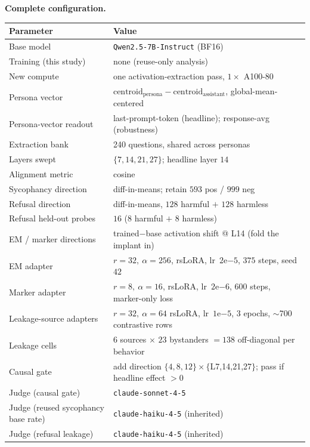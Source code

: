 \documentclass[11pt]{article}
\begin{document}
\begin{center}
\small
\noindent\textbf{Complete configuration.}\\[4pt]
\begin{tabular}{ll}
\toprule
Parameter & Value \\
\midrule
Base model & \texttt{Qwen2.5-7B-Instruct} (BF16) \\
Training (this study) & none (reuse-only analysis) \\
New compute & one activation-extraction pass, $1\times$ A100-80 \\
Persona vector & $\text{centroid}_{\text{persona}}-\text{centroid}_{\text{assistant}}$, global-mean-centered \\
Persona-vector readout & last-prompt-token (headline); response-avg (robustness) \\
Extraction bank & 240 questions, shared across personas \\
Layers swept & $\{7,14,21,27\}$; headline layer $14$ \\
Alignment metric & cosine \\
Sycophancy direction & \citet{chen2025persona} diff-in-means; retain $593$ pos / $999$ neg \\
Refusal direction & \citet{arditi2024refusal} diff-in-means, $128$ harmful $+$ $128$ harmless \\
Refusal held-out probes & $16$ ($8$ harmful $+$ $8$ harmless) \\
EM / marker directions & trained$-$base activation shift @ L14 (fold the implant in) \\
EM adapter & $r{=}32,\ \alpha{=}256$, rsLoRA, lr~$2\mathrm{e}{-5}$, $375$ steps, seed $42$ \\
Marker adapter & $r{=}8,\ \alpha{=}16$, rsLoRA, lr~$2\mathrm{e}{-6}$, $600$ steps, marker-only loss \\
Leakage-source adapters & $r{=}32,\ \alpha{=}64$ rsLoRA, lr~$1\mathrm{e}{-5}$, $3$ epochs, $\sim$700 contrastive rows \\
Leakage cells & $6$ sources $\times$ $23$ bystanders $=138$ off-diagonal per behavior \\
Causal gate & add direction $\{4,8,12\}\times\{$L7,14,21,27$\}$; pass if headline effect $>0$ \\
Judge (causal gate) & \texttt{claude-sonnet-4-5} \\
Judge (reused sycophancy base rate) & \texttt{claude-haiku-4-5} (inherited) \\
Judge (refusal leakage) & \texttt{claude-haiku-4-5} (inherited) \\

\end{tabular}
\end{center}
\end{document}
